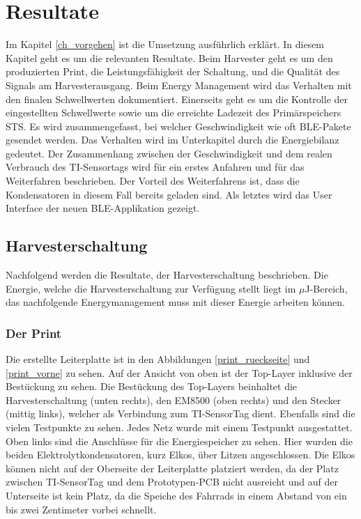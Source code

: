 \chapter{Resultate}
\label{ch_resultat}

Im Kapitel \ref{ch_vorgehen} ist die Umsetzung ausführlich erklärt. In diesem Kapitel geht es um die relevanten Resultate. Beim Harvester geht es um den produzierten Print, die Leistungsfähigkeit der Schaltung, und die Qualität des Signals am Harvesterausgang. Beim Energy Management wird das Verhalten mit den finalen Schwellwerten dokumentiert. Einerseits geht es um die Kontrolle der eingestellten Schwellwerte sowie um die erreichte Ladezeit des Primärspeichers STS. Es wird zusammengefasst, bei welcher Geschwindigkeit wie oft BLE-Pakete gesendet werden. Das Verhalten wird im Unterkapitel durch die Energiebilanz gedeutet. Der Zusammenhang zwischen der Geschwindigkeit und dem realen Verbrauch des TI-Sensortags wird für ein erstes Anfahren und für das Weiterfahren beschrieben. Der Vorteil des Weiterfahrens ist, dass die Kondensatoren in diesem Fall bereits geladen sind. Als letztes wird das User Interface der neuen BLE-Applikation gezeigt.
 
\section{Harvesterschaltung}

Nachfolgend werden die Resultate, der Harvesterschaltung beschrieben. Die Energie, welche die Harvesterschaltung zur Verfügung stellt liegt im $\mu$J-Bereich, das nachfolgende Energymanagement muss mit dieser Energie arbeiten können.

\subsection{Der Print}

Die erstellte Leiterplatte ist in den Abbildungen \ref{print_rueckseite} und \ref{print_vorne} zu sehen. Auf der Ansicht von oben ist der Top-Layer inklusive der Bestückung zu sehen. Die Bestückung des Top-Layers beinhaltet die Harvesterschaltung (unten rechts), den EM8500 (oben rechts) und den Stecker (mittig links), welcher als Verbindung zum TI-SensorTag dient. Ebenfalls sind die vielen Testpunkte zu sehen. Jedes Netz wurde mit einem Testpunkt ausgestattet. Oben links sind die Anschlüsse für die Energiespeicher zu sehen. Hier wurden die beiden Elektrolytkondensatoren, kurz Elkos, über Litzen angeschlossen. Die Elkos können nicht auf der Oberseite der Leiterplatte platziert werden, da der Platz zwischen TI-SensorTag und dem Prototypen-PCB nicht ausreicht und auf der Unterseite ist kein Platz, da die Speiche des Fahrrads in einem Abstand von ein bis zwei Zentimeter vorbei schnellt.\\

